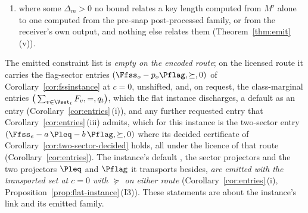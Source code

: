 \begin{corollary}
\begin{enumerate}[label=(\roman*),leftmargin=3.0em]
\item where some $\Delta_m>0$ no bound relates a key length computed from
  $M'$ alone to one computed from the pre-snap post-processed family, or from
  the receiver's own output, and nothing else relates them
  (Theorem~\ref{thm:emit}\,(v)).
\end{enumerate}
The emitted constraint list is \emph{empty on the encoded route}; on the
licensed route it carries the flag-sector entries
$(\Ffss_o-p_o\Pflag,\succeq,0)$ of Corollary~\ref{cor:fssinstance} at $c=0$,
unshifted, and, on request, the class-marginal entries
$\big(\sum_{v\in\Vset_t}F_v,=,q_t\big)$, which the flat instance discharges,
a default  as an entry
(Corollary~\ref{cor:entries}\,(i)),
and any further requested entry that Corollary~\ref{cor:entries}\,(iii)
admits, which for this instance is the two-sector entry
$(\Ffss_e-a\,\Pleq-b\,\Pflag,\succeq,0)$ where its decided certificate of
Corollary~\ref{cor:two-sector-decided} holds, all under the licence of that
route (Corollary~\ref{cor:entries}). The instance's default
,
the sector projectors and the two projectors $\Pleq$ and $\Pflag$ it
transports besides, \emph{are emitted with the transported set at $c=0$ with
$\succeq$ on either route} (Corollary~\ref{cor:entries}\,(i),
Proposition~\ref{prop:flat-instance}\,(I3)). These statements are about the
instance's link and its emitted family.
\end{corollary}

